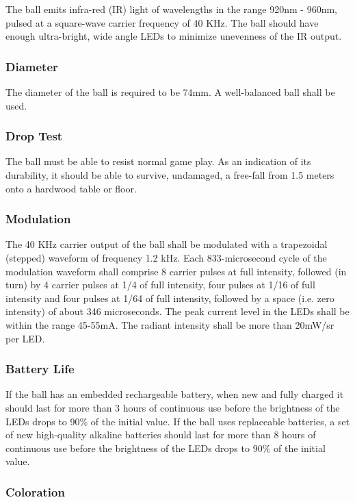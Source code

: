 \documentclass{article}
\begin{document}
The ball emits infra-red (IR) light of wavelengths in the range 920nm - 960nm,
pulsed at a square-wave carrier frequency of 40 KHz. The ball should have
enough ultra-bright, wide angle LEDs to minimize unevenness of the IR output.

\subsubsection{Diameter}

The diameter of the ball is required to be 74mm. A well-balanced ball shall be
used.

\subsubsection{Drop Test}

The ball must be able to resist normal game play. As an indication of its
durability, it should be able to survive, undamaged, a free-fall from 1.5
meters onto a hardwood table or floor.

\subsubsection{Modulation}

The 40 KHz carrier output of the ball shall be modulated with a trapezoidal
(stepped) waveform of frequency 1.2 kHz. Each 833-microsecond cycle of the
modulation waveform shall comprise 8 carrier pulses at full intensity, followed
(in turn) by 4 carrier pulses at 1/4 of full intensity, four pulses at 1/16 of
full intensity and four pulses at 1/64 of full intensity, followed by a space
(i.e. zero intensity) of about 346 microseconds. The peak current level in the
LEDs shall be within the range 45-55mA. The radiant intensity shall be more
than 20mW/sr per LED.

\subsubsection{Battery Life}

If the ball has an embedded rechargeable battery, when new and fully charged it
should last for more than 3 hours of continuous use before the brightness of
the LEDs drops to 90\% of the initial value. If the ball uses replaceable
batteries, a set of new high-quality alkaline batteries should last for more
than 8 hours of continuous use before the brightness of the LEDs drops to 90\%
of the initial value.

\subsubsection{Coloration}
\end{document}
